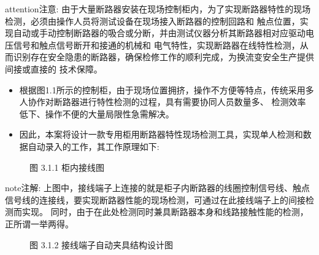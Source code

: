 \documentclass[a4paper,10pt,english]{sphinxmanual}
\begin{document}
\begin{sphinxadmonition}{attention}{注意:}
\sphinxAtStartPar
由于大量断路器安装在现场控制柜内，为了实现断路器特性的现场检测，必须由操作人员将测试设备在现场接入断路器的控制回路和
触点位置，实现自动或手动控制断路器的吸合或分断，并由测试仪器分析其断路器相对应驱动电压信号和触点信号断开和接通的机械和
电气特性，实现断路器在线特性检测，从而识别存在安全隐患的断路器，确保检修工作的顺利完成，为换流变安全生产提供间接或直接的
技术保障。
\end{sphinxadmonition}
\begin{itemize}
\item {} 
\sphinxAtStartPar
根据图1.1所示的控制柜，由于现场位置拥挤，操作不方便等特点，传统采用多人协作对断路器进行特性检测的过程，具有需要协同人员数量多、
检测效率低下、操作不便的大量局限性急需解决。

\item {} 
\sphinxAtStartPar
因此，本案将设计一款专用柜用断路器特性现场检测工具，实现单人检测和数据自动录入的工作，其工作原理如下:

\end{itemize}

\begin{figure}[htbp]
\centering
\capstart

\noindent{}
\caption{图 3.1.1 柜内接线图}\label{\detokenize{work_principle:id4}}\end{figure}

\begin{sphinxadmonition}{note}{注解:}
\sphinxAtStartPar
上图中，接线端子上连接的就是柜子内断路器的线圈控制信号线、触点信号线的连接线，要实现断路器性能的现场检测，可通过在此接线端子上的间接检测而实现。
同时，由于在此处检测同时兼具断路器本身和线路接触性能的检测，正所谓一举两得。
\end{sphinxadmonition}

\begin{figure}[htbp]
\centering
\capstart

\noindent{}
\caption{图 3.1.2 接线端子自动夹具结构设计图}\label{\detokenize{work_principle:id5}}\end{figure}
\end{document}

